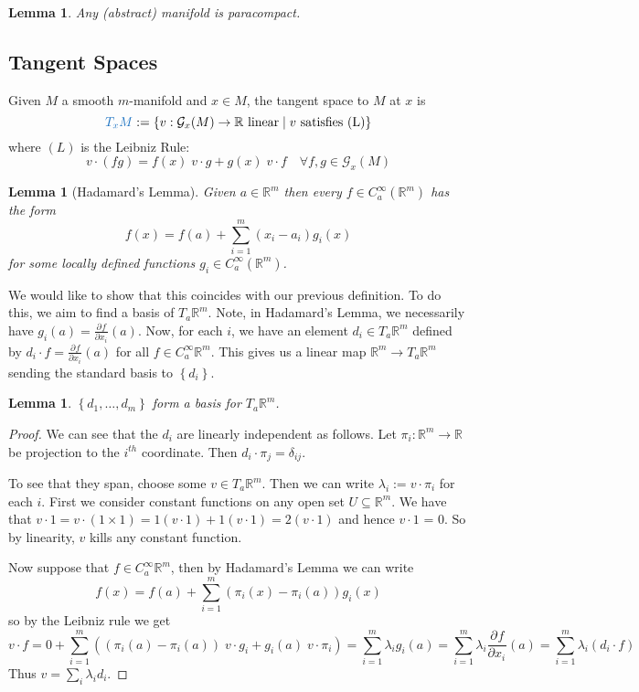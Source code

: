 \documentclass[11pt]{article}
\newcommand{\defeq}{:=}
\newcommand{\relmiddle}[1]{\mathrel{}\middle#1\mathrel{}}
\newcommand{\rmv}{\relmiddle|}
\newcommand{\R}{\mathbb{R}}
\newcommand*{\pd}[3][]{\ensuremath{\frac{\partial^{#1} {#2}}{\partial {#3}^{#1}}}}
\newenvironment{defin}
	{\begin{mdframed}[backgroundcolor=white, roundcorner=5pt, linewidth=1pt, linecolor=RoyalBlue]
		\setlength{\parindent}{0pt}}
	{\end{mdframed}}
\newcommand{\mdf}[1]{{\color{RoyalBlue} #1}}
\newtheorem{lemma}[theorem]{Lemma}
\begin{document}
\begin{lemma}
Any (abstract) manifold is paracompact.
\end{lemma}

\subsection{Tangent Spaces}

\begin{defin}
	Given $M$ a smooth $m$-manifold and $x\in M$, the \mdf{tangent space} to $M$ at $x$ is
	\[
		\mdf{T_xM}\defeq\left\{ v: \mathcal{G}_x(M) \to \R \text{ linear} \rmv v\text{ satisfies (L)}\right\}
	\]
	where $(L)$ is the Leibniz Rule:
	\[
		v\cdot(fg) = f(x) \; v \cdot g + g(x) \;v \cdot f \quad \forall f, g\in \mathcal{G}_x(M)
	\]
\end{defin}

\begin{lemma}[Hadamard's Lemma]
Given $a\in \R^m$ then every $f\in C^\infty_a (\R^m)$ has the form
\[
	f(x) = f(a) + \sum_{i=1}^{m}(x_i- a_i)g_i(x)
\]
for some locally defined functions $g_i\in C^\infty_a(\R^m)$.
\end{lemma}

We would like to show that this coincides with our previous definition.
To do this, we aim to find a basis of $T_a\R^m$.
Note, in Hadamard's Lemma, we necessarily have $g_i(a) = \pd{f}{x_i}(a)$.
Now, for each $i$, we have an element $d_i\in T_a\R^m$ defined by $d_i \cdot f = \pd{f}{x_i}(a)$ for all $f\in C^\infty_a\R^m$.
This gives us a linear map $\R^m \to T_a\R^m$ sending the standard basis to $\left\{ d_i\right\}$.

\begin{lemma}
$\left\{ d_1, \dots , d_m\right\}$ form a basis for $T_a\R^m$.
\end{lemma}

\begin{proof}
We can see that the $d_i$ are linearly independent as follows.
Let $\pi_i: \R^m \to \R$ be projection to the $i^{th}$ coordinate.
Then $d_i \cdot \pi_j = \delta_{ij}$.

To see that they span, choose some $v\in T_a\R^m$.
Then we can write $\lambda_i \defeq v \cdot \pi_i$ for each $i$.
First we consider constant functions on any open set $U\subseteq \R^m$.
We have that $v\cdot 1 = v\cdot (1\times 1) = 1(v\cdot 1) + 1(v \cdot 1) = 2(v\cdot 1)$ and hence $v\cdot 1$ = 0.
So by linearity, $v$ kills any constant function.

Now suppose that $f\in C_a^\infty \R^m$, then by Hadamard's Lemma we can write
\[
	f(x) = f(a) + \sum_{i=1}^m (\pi_i(x) - \pi_i(a)) g_i(x)
\]
so by the Leibniz rule we get
\[
	v \cdot f = 0 + \sum_{i=1}^m\left( (\pi_i(a) - \pi_i(a)) \; v\cdot g_i + g_i(a) \; v\cdot \pi_i\right) = \sum_{i=1}^m \lambda_i g_i(a) = \sum_{i=1}^m \lambda_i \pd{f}{x_i}(a) = \sum_{i=1}^m \lambda_i (d_i \cdot f)
\]
Thus $v=\sum_{i}\lambda_i d_i$.
\end{proof}
\end{document}
